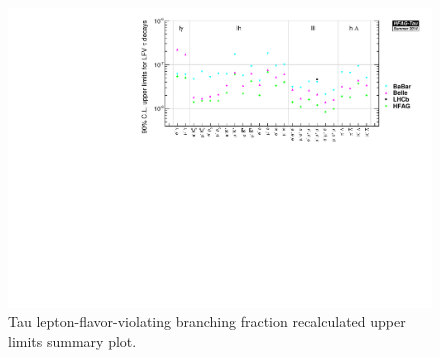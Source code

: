 \begin{figure}[tb]
  \begin{center}

    \includegraphics[angle=270,totalheight=0.9\textheight,clip]{figures/tau/TauLFV_UL_2013001_averaged.pdf}
        \caption{Tau lepton-flavor-violating branching fraction recalculated upper
      limits summary plot.
      \label{fig:tau:lfv-limits-plot_average}
    }
  \end{center}
\end{figure}
